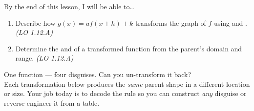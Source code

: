 \documentclass[10pt]{article}
\begin{document}
\namedateperiod

\vspace{0.08in}

\begin{objectivebox}
By the end of this lesson, I will be able to\ldots
\begin{enumerate}[itemsep=2pt]
  \item Describe how $g(x) = af(x+h)+k$ transforms the graph of $f$ using
        \blank{3cm} and \blank{3cm}. \hfill\textit{(LO 1.12.A)}
  \item Determine the \blank{2.4cm} and \blank{2cm} of a transformed function
        from the parent's domain and range. \hfill\textit{(LO 1.12.A)}
\end{enumerate}
\end{objectivebox}

\vspace{0.06in}

\begin{vocabbox}
\end{vocabbox}

\vspace{0.06in}

\begin{hookbox}
One function --- four disguises. Can you un-transform it back? \\[4pt]
Each transformation below produces the \textit{same} parent shape in a different location
or size. Your job today is to decode the rule so you can construct \textit{any} disguise
or reverse-engineer it from a table.
\end{hookbox}

\vspace{0.06in}
\end{document}
